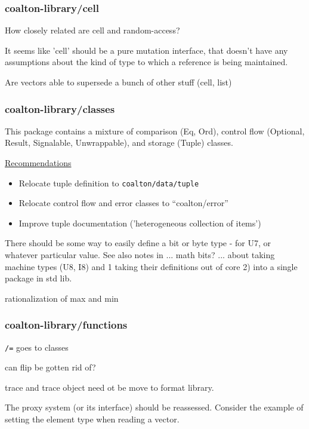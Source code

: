 \documentclass[12pt]{article}
\newcommand{\code}{\texttt}
\begin{document}
\subsubsection{coalton-library/cell}

How closely related are cell and random-access?

It seems like 'cell' should be a pure mutation interface,
that doesn't have any assumptions about the kind of type to which a
reference is being maintained.

Are vectors able to supersede a bunch of other stuff (cell, list)

\subsubsection{coalton-library/classes}

This package contains a mixture of comparison (Eq, Ord), control flow
(Optional, Result, Signalable, Unwrappable), and storage (Tuple)
classes.

\bigskip
\underline{Recommendations}

\begin{itemize}
\item Relocate tuple definition to \code{coalton/data/tuple}
\item Relocate control flow and error classes to ``coalton/error''
\item Improve tuple documentation ('heterogeneous collection of items')
\end{itemize}

There should be some way to easily define a bit or byte type -
for U7, or whatever particular value. See also notes in ... math bits?
... about taking machine types (U8, I8) and 1 taking their definitions
out of core 2) into a single package in std lib.

rationalization of max and min

\subsubsection{coalton-library/functions}

\code{/=} goes to classes

can flip be gotten rid of?

trace and trace object need ot be move to format library.

The proxy system (or its interface) should be reassessed. Consider
the example of setting the element type when reading a vector.
\end{document}

